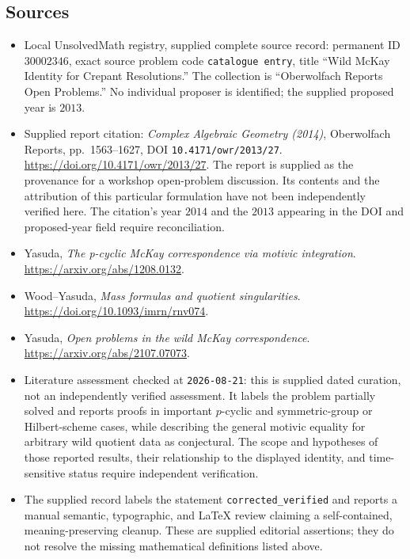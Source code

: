 \documentclass[11pt]{article}
\begin{document}
\subsection{Sources}
\begin{itemize}
\item Local UnsolvedMath registry, supplied complete source record: permanent ID \(30002346\), exact source problem code \texttt{catalogue entry}, title ``Wild McKay Identity for Crepant Resolutions.'' The collection is ``Oberwolfach Reports Open Problems.'' No individual proposer is identified; the supplied proposed year is \(2013\).
\item Supplied report citation: \emph{Complex Algebraic Geometry (2014)}, Oberwolfach Reports, pp.\ 1563--1627, DOI \texttt{10.4171/owr/2013/27}. \url{https://doi.org/10.4171/owr/2013/27}. The report is supplied as the provenance for a workshop open-problem discussion. Its contents and the attribution of this particular formulation have not been independently verified here. The citation's year \(2014\) and the \(2013\) appearing in the DOI and proposed-year field require reconciliation.
\item Yasuda, \emph{The p-cyclic McKay correspondence via motivic integration}. \url{https://arxiv.org/abs/1208.0132}.
\item Wood--Yasuda, \emph{Mass formulas and quotient singularities}. \url{https://doi.org/10.1093/imrn/rnv074}.
\item Yasuda, \emph{Open problems in the wild McKay correspondence}. \url{https://arxiv.org/abs/2107.07073}.
\item Literature assessment checked at \texttt{2026-08-21}: this is supplied dated curation, not an independently verified assessment. It labels the problem partially solved and reports proofs in important \(p\)-cyclic and symmetric-group or Hilbert-scheme cases, while describing the general motivic equality for arbitrary wild quotient data as conjectural. The scope and hypotheses of those reported results, their relationship to the displayed identity, and time-sensitive status require independent verification.
\item The supplied record labels the statement \texttt{corrected\_verified} and reports a manual semantic, typographic, and LaTeX review claiming a self-contained, meaning-preserving cleanup. These are supplied editorial assertions; they do not resolve the missing mathematical definitions listed above.
\end{itemize}
\end{document}

